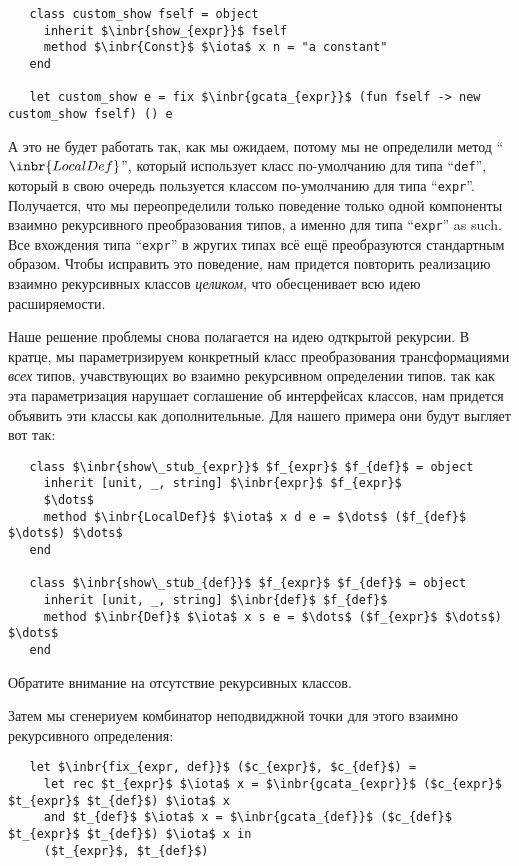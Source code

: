 \begin{lstlisting}
   class custom_show fself = object 
     inherit $\inbr{show_{expr}}$ fself
     method $\inbr{Const}$ $\iota$ x n = "a constant"
   end

   let custom_show e = fix $\inbr{gcata_{expr}}$ (fun fself -> new custom_show fself) () e
\end{lstlisting}

А это не будет работать так, как мы ожидаем, потому мы не определили метод
``$\inbr{LocalDef}$'', который использует класс по-умолчанию для типа  ``\lstinline{def}'', который в свою очередь пользуется классом по-умолчанию для типа  ``\lstinline{expr}''.
Получается, что мы переопределили только поведение только одной компоненты взаимно рекурсивного преобразования типов, а именно для типа ``\lstinline{expr}'' as such. 
Все вхождения типа ``\lstinline{expr}'' в жругих типах всё ещё преобразуются стандартным образом. Чтобы исправить это поведение, нам придется повторить реализацию взаимно рекурсивных классов \emph{целиком}, что обесценивает всю идею расширяемости.

Наше решение проблемы снова полагается на идею одткрытой рекурсии. В кратце, мы параметризируем конкретный класс преобразования трансформациями \emph{всех} типов, учавствующих во взаимно рекурсивном определении типов.
так как эта параметризация нарушает соглашение об интерфейсах классов, нам придется объявить эти классы как дополнительные. Для нашего примера они будут выгляет вот так:

\begin{lstlisting}
   class $\inbr{show\_stub_{expr}}$ $f_{expr}$ $f_{def}$ = object 
     inherit [unit, _, string] $\inbr{expr}$ $f_{expr}$
     $\dots$
     method $\inbr{LocalDef}$ $\iota$ x d e = $\dots$ ($f_{def}$ $\dots$) $\dots$
   end

   class $\inbr{show\_stub_{def}}$ $f_{expr}$ $f_{def}$ = object 
     inherit [unit, _, string] $\inbr{def}$ $f_{def}$
     method $\inbr{Def}$ $\iota$ x s e = $\dots$ ($f_{expr}$ $\dots$) $\dots$
   end
\end{lstlisting}

Обратите внимание на отсутствие рекурсивных классов.


Затем мы сгенериуем комбинатор неподвиджной точки для этого взаимно рекурсивного определения:

\begin{lstlisting}
   let $\inbr{fix_{expr, def}}$ ($c_{expr}$, $c_{def}$) =
     let rec $t_{expr}$ $\iota$ x = $\inbr{gcata_{expr}}$ ($c_{expr}$ $t_{expr}$ $t_{def}$) $\iota$ x
     and $t_{def}$ $\iota$ x = $\inbr{gcata_{def}}$ ($c_{def}$ $t_{expr}$ $t_{def}$) $\iota$ x in
     ($t_{expr}$, $t_{def}$)
\end{lstlisting}

